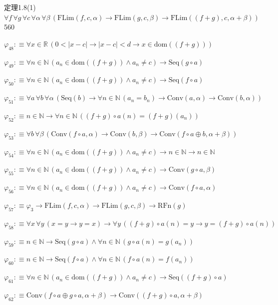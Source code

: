\begin{fullproof}{定理1.8(1)}{$\forall f\,\forall g\,\forall c\,\forall \alpha\,\forall \beta\,(\mathrm{FLim}(f,c,\alpha) \to \mathrm{FLim}(g,c,\beta) \to \mathrm{FLim}((f + g),c,\alpha + \beta))$}{560}
\begin{abbrevlist}
\item $\varphi_{48} :\equiv \forall x \in \mathbb{R}\,(0 < \lvert x - c \rvert \to \lvert x - c \rvert < d \to x \in \mathrm{dom}((f + g)))$
\item $\varphi_{49} :\equiv \forall n \in \mathbb{N}\,(a_{n} \in \mathrm{dom}((f + g)) \land a_{n} \neq c) \to \mathrm{Seq}(g \circ a)$
\item $\varphi_{50} :\equiv \forall n \in \mathbb{N}\,(a_{n} \in \mathrm{dom}((f + g)) \land a_{n} \neq c) \to \mathrm{Seq}(f \circ a)$
\item $\varphi_{51} :\equiv \forall a\,\forall b\,\forall \alpha\,(\mathrm{Seq}(b) \to \forall n \in \mathbb{N}\,(a_{n} = b_{n}) \to \mathrm{Conv}(a,\alpha) \to \mathrm{Conv}(b,\alpha))$
\item $\varphi_{52} :\equiv n \in \mathbb{N} \to \forall n \in \mathbb{N}\,((f + g) \circ a(n) = (f + g)(a_{n}))$
\item $\varphi_{53} :\equiv \forall b\,\forall \beta\,(\mathrm{Conv}(f \circ a,\alpha) \to \mathrm{Conv}(b,\beta) \to \mathrm{Conv}(f \circ a \oplus b,\alpha + \beta))$
\item $\varphi_{54} :\equiv \forall n \in \mathbb{N}\,(a_{n} \in \mathrm{dom}((f + g)) \land a_{n} \neq c) \to n \in \mathbb{N} \to n \in \mathbb{N}$
\item $\varphi_{55} :\equiv \forall n \in \mathbb{N}\,(a_{n} \in \mathrm{dom}((f + g)) \land a_{n} \neq c) \to \mathrm{Conv}(g \circ a,\beta)$
\item $\varphi_{56} :\equiv \forall n \in \mathbb{N}\,(a_{n} \in \mathrm{dom}((f + g)) \land a_{n} \neq c) \to \mathrm{Conv}(f \circ a,\alpha)$
\item $\varphi_{57} :\equiv \varphi_{3} \to \mathrm{FLim}(f,c,\alpha) \to \mathrm{FLim}(g,c,\beta) \to \mathrm{RFn}(g)$
\item $\varphi_{58} :\equiv \forall x\,\forall y\,(x = y \to y = x) \to \forall y\,((f + g) \circ a(n) = y \to y = (f + g) \circ a(n))$
\item $\varphi_{59} :\equiv n \in \mathbb{N} \to \mathrm{Seq}(g \circ a) \land \forall n \in \mathbb{N}\,(g \circ a(n) = g(a_{n}))$
\item $\varphi_{60} :\equiv n \in \mathbb{N} \to \mathrm{Seq}(f \circ a) \land \forall n \in \mathbb{N}\,(f \circ a(n) = f(a_{n}))$
\item $\varphi_{61} :\equiv \forall n \in \mathbb{N}\,(a_{n} \in \mathrm{dom}((f + g)) \land a_{n} \neq c) \to \mathrm{Seq}((f + g) \circ a)$
\item $\varphi_{62} :\equiv \mathrm{Conv}(f \circ a \oplus g \circ a,\alpha + \beta) \to \mathrm{Conv}((f + g) \circ a,\alpha + \beta)$

\end{abbrevlist}
\end{fullproof}
